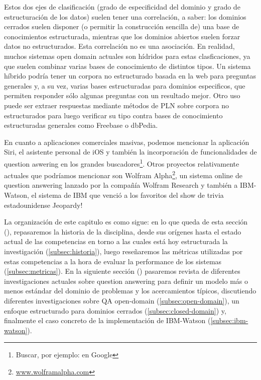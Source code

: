 Estos dos ejes de clasificación (grado de especificidad del dominio y grado de estructuración de los datos) suelen tener una correlación, a saber: los dominios cerrados suelen disponer (o permitir la construcción sencilla de) una base de conocimientos estructurada, mientras que los dominios abiertos suelen forzar datos no estructurados. Esta correlación no es una asociación. En realidad, muchos sistemas open domain actuales son hídridos para estas clasficaciones, ya que suelen combinar varias bases de conocimiento de distintos tipos. Un sistema híbrido podría tener un corpora no estructurado basada en la web para preguntas generales y, a su vez, varias bases estructuradas para dominios especificos, que permiten responder sólo algunas preguntas con un resultado mejor. Otro uso puede ser extraer respuestas mediante métodos de PLN sobre corpora no estructurados para luego verificar su tipo contra bases de conocimiento estructuradas generales como Freebase o dbPedia. 

En cuanto a aplicaciones comerciales masivas, podemos mencionar la aplicación Siri, el asistente personal de iOS y también la incorporación de funcionalidades de question aswering en los grandes buscadores\footnote{Buscar, por ejemplo:  en Google}.  Otros proyectos relativamente actuales que podríamos mencionar son Wolfram Alpha\footnote{\url{www.wolframalpha.com}}, un sistema online de question answering lanzado por la compañía Wolfram Research y también a IBM-Watson, el sistema de IBM que venció a los favoritos del show de trivia estadounidense Jeopardy!

La organización de este capitulo es como sigue: en lo que queda de esta sección (), repasaremos la historia de la disciplina, desde sus orígenes hasta el estado actual de las competencias en torno a las cuales está hoy estructurada la investigación (\ref{subsec:historia}), luego reseñaremos las métricas utilizadas por estas competencias a la hora de evaluar la performance de los sistemas (\ref{subsec:metricas}). En la siguiente sección () pasaremos revista de diferentes investigaciones actuales sobre question answering para definir un modelo más o menos estándar del dominio de problemas y los acercamientos típicos, discutiendo diferentes investigaciones sobre QA open-domain (\ref{subsec:open-domain}), un enfoque estructurado para dominios cerrados (\ref{subsec:closed-domain}) y, finalmente el caso concreto de la implementación de IBM-Watson (\ref{subsec:ibm-watson}).


